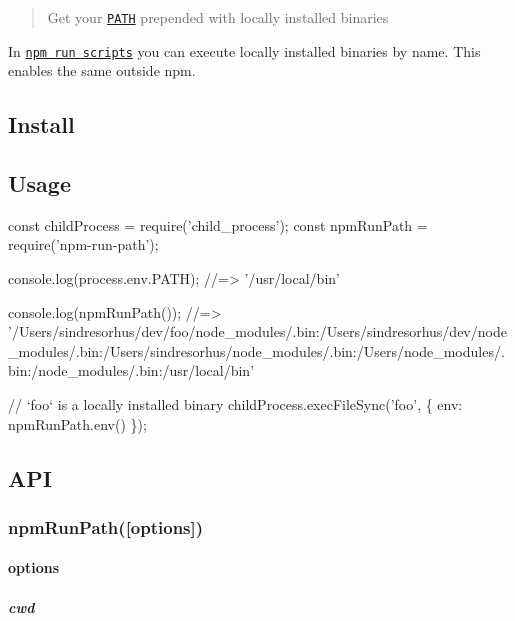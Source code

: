 \begin{quote}
Get your \href{https://en.wikipedia.org/wiki/PATH_(variable)}{\tt P\+A\+TH} prepended with locally installed binaries \end{quote}


In \href{https://docs.npmjs.com/cli/run-script}{\tt npm run scripts} you can execute locally installed binaries by name. This enables the same outside npm.

\subsection*{Install}




\subsection*{Usage}


\begin{DoxyCode}
const childProcess = require('child\_process');
const npmRunPath = require('npm-run-path');

console.log(process.env.PATH);
//=> '/usr/local/bin'

console.log(npmRunPath());
//=>
       '/Users/sindresorhus/dev/foo/node\_modules/.bin:/Users/sindresorhus/dev/node\_modules/.bin:/Users/sindresorhus/node\_modules/.bin:/Users/node\_modules/.bin:/node\_modules/.bin:/usr/local/bin'

// `foo` is a locally installed binary
childProcess.execFileSync('foo', \{
  env: npmRunPath.env()
\});
\end{DoxyCode}


\subsection*{A\+PI}

\subsubsection*{npm\+Run\+Path(\mbox{[}options\mbox{]})}

\paragraph*{options}

\subparagraph*{cwd}

